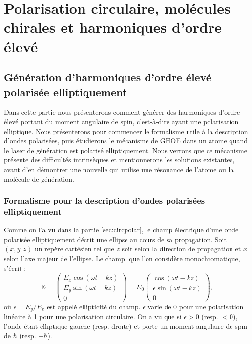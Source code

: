 \part{Polarisation circulaire, molécules chirales et harmoniques d'ordre élevé}
\label{PA:Spin_HHG}
\chapter{Génération d'harmoniques d'ordre élevé polarisée elliptiquement}
\label{CH:Circular_HHG}
Dans cette partie nous présenterons comment générer des harmoniques d'ordre élevé portant du moment angulaire de spin, c'est-à-dire ayant une polarisation elliptique. Nous présenterons pour commencer le formalisme utile à la description d'ondes polarisées, puis étudierons le mécanisme de GHOE dans un atome quand le laser de génération est polarisé elliptiquement. Nous verrons que ce mécanisme présente des difficultés intrinsèques et mentionnerons les solutions existantes, avant d'en démontrer une nouvelle qui utilise une résonance de l'atome ou la molécule de génération.

\section{Formalisme pour la description d'ondes polarisées elliptiquement}
\label{sec:polardef}
Comme on l'a vu dans la partie \ref{sec:circpolar}, le champ électrique d'une onde polarisée elliptiquement décrit une ellipse au cours de sa propagation. Soit $(x,y,z)$ un repère cartésien tel que $z$ soit selon la direction de propagation et $x$ selon l'axe majeur de l'ellipse. Le champ, que l'on considère monochromatique, s'écrit :
\begin{equation}
\bm{E}=\begin{pmatrix}
E_{x}\cos{(\omega t-kz)}\\
E_{y}\sin{(\omega t-kz)}\\
0
\end{pmatrix}=E_{0}
\begin{pmatrix}
\cos{(\omega t-kz)}\\
\epsilon\sin{(\omega t-kz)}\\
0
\end{pmatrix},
\label{eq:jones}
\end{equation}
où $\epsilon = E_{y}/E_{x}$ est appelé ellipticité du champ. $\epsilon$ varie de 0 pour une polarisation linéaire à 1 pour une polarisation circulaire.  On a vu que si $\epsilon>0$ (resp. $<0$), l'onde était elliptique gauche (resp. droite) et porte un moment angulaire de spin de $\hbar$ (resp. $-\hbar$). 

